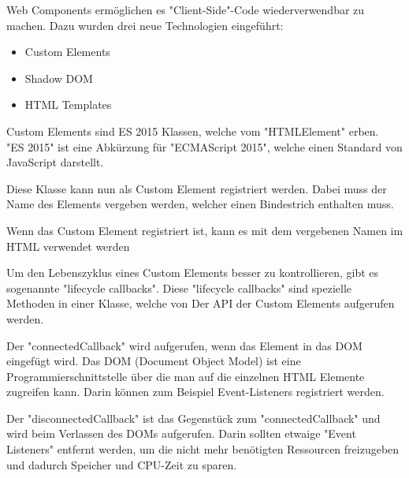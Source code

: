 
Web Components ermöglichen es "Client-Side"-Code wiederverwendbar zu machen. Dazu wurden drei neue Technologien \cite{MDNWebComponents} eingeführt:

\begin{itemize}
    \item Custom Elements
    \item Shadow DOM
    \item HTML Templates
\end{itemize}




Custom Elements sind ES 2015 Klassen, welche vom "HTMLElement" erben.\\ "ES 2015" ist eine Abkürzung für "ECMAScript 2015", welche einen Standard von JavaScript darstellt.


Diese Klasse kann nun als Custom Element registriert werden. Dabei muss der Name des Elements vergeben werden, welcher einen Bindestrich enthalten muss.


Wenn das Custom Element registriert ist, kann es mit dem vergebenen Namen im HTML verwendet werden



Um den Lebenszyklus eines Custom Elements besser zu kontrollieren, gibt es sogenannte "lifecycle callbacks". Diese "lifecycle callbacks" sind spezielle Methoden in einer Klasse, welche von Der API der Custom Elements aufgerufen werden.

Der "connectedCallback" wird aufgerufen, wenn das Element in das DOM eingefügt wird. Das DOM (Document Object Model) ist eine Programmierschnittstelle über die man auf die einzelnen HTML Elemente zugreifen kann. Darin können zum Beispiel Event-Listeners registriert werden.

   
Der "disconnectedCallback" ist das Gegenstück zum "connectedCallback" und wird beim Verlassen des DOMs aufgerufen. Darin sollten etwaige "Event Listeners" entfernt werden, um die nicht mehr benötigten Ressourcen freizugeben und dadurch Speicher und CPU-Zeit zu sparen.  

